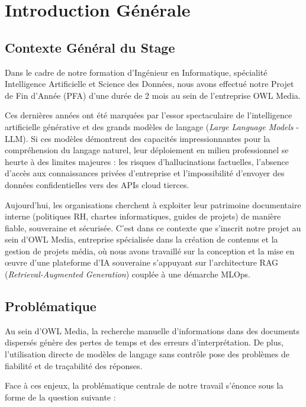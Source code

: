 \chapter*{Introduction Générale}
\label{chap:introduction}

\section*{Contexte Général du Stage}
Dans le cadre de notre formation d'Ingénieur en Informatique, spécialité Intelligence Artificielle et Science des Données, nous avons effectué notre Projet de Fin d'Année (PFA) d'une durée de 2 mois au sein de l'entreprise OWL Media.

Ces dernières années ont été marquées par l'essor spectaculaire de l'intelligence artificielle générative et des grands modèles de langage (\textit{Large Language Models} - LLM). Si ces modèles démontrent des capacités impressionnantes pour la compréhension du langage naturel, leur déploiement en milieu professionnel se heurte à des limites majeures : les risques d'hallucinations factuelles, l'absence d'accès aux connaissances privées d'entreprise et l'impossibilité d'envoyer des données confidentielles vers des APIs cloud tierces.

Aujourd'hui, les organisations cherchent à exploiter leur patrimoine documentaire interne (politiques RH, chartes informatiques, guides de projets) de manière fiable, souveraine et sécurisée. C'est dans ce contexte que s'inscrit notre projet au sein d'OWL Media, entreprise spécialisée dans la création de contenus et la gestion de projets média, où nous avons travaillé sur la conception et la mise en œuvre d'une plateforme d'IA souveraine s'appuyant sur l'architecture RAG (\textit{Retrieval-Augmented Generation}) couplée à une démarche MLOps.

\section*{Problématique}
Au sein d'OWL Media, la recherche manuelle d'informations dans des documents dispersés génère des pertes de temps et des erreurs d'interprétation. De plus, l'utilisation directe de modèles de langage sans contrôle pose des problèmes de fiabilité et de traçabilité des réponses.

Face à ces enjeux, la problématique centrale de notre travail s'énonce sous la forme de la question suivante :

